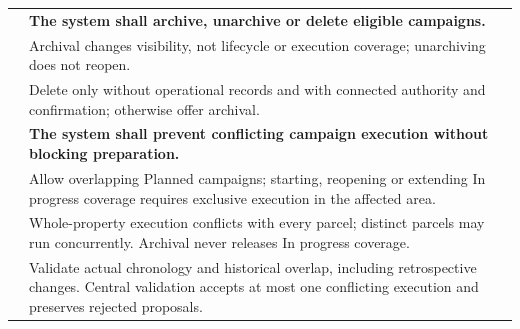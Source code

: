 {\begin{longtable}{L{0.18}L{0.82}}
\midrule
{}
\label{fr:018}\textbf{} & \textbf{The system shall archive, unarchive or delete eligible campaigns.}\\*
\label{ac:018:a} & Archival changes visibility, not lifecycle or execution coverage; unarchiving does not reopen.\\
\label{ac:018:b} & Delete only without operational records and with connected authority and confirmation; otherwise offer archival.\\
\midrule
{}
\label{fr:019}\textbf{} & \textbf{The system shall prevent conflicting campaign execution without blocking preparation.}\\*
\label{ac:019:a} & Allow overlapping Planned campaigns; starting, reopening or extending In progress coverage requires exclusive execution in the affected area.\\
\label{ac:019:b} & Whole-property execution conflicts with every parcel; distinct parcels may run concurrently. Archival never releases In progress coverage.\\
\label{ac:019:c} & Validate actual chronology and historical overlap, including retrospective changes. Central validation accepts at most one conflicting execution and preserves rejected proposals.\\
\end{longtable}
}
